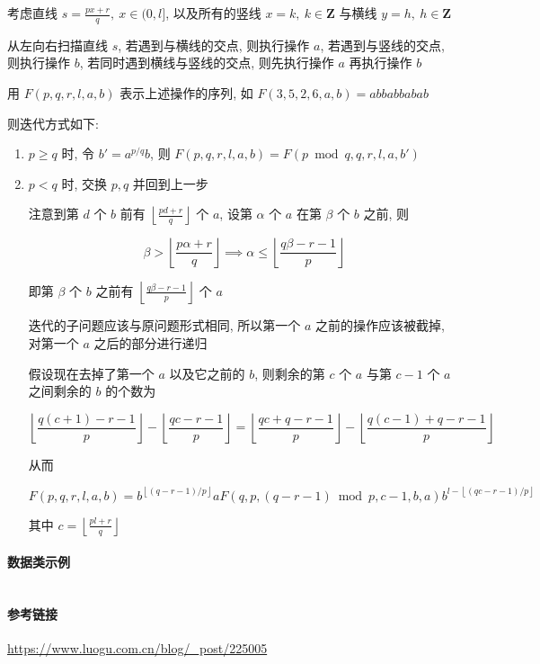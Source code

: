 考虑直线 \(s=\frac{px+r}{q},~x\in (0,l]\), 以及所有的竖线 \(x=k,~k\in\mathbf{Z}\) 与横线 \(y=h,~h\in\mathbf{Z}\)

从左向右扫描直线 \(s\), 若遇到与横线的交点, 则执行操作 \(a\), 若遇到与竖线的交点, 则执行操作 \(b\), 若同时遇到横线与竖线的交点, 则先执行操作 \(a\) 再执行操作 \(b\)

用 \(F(p,q,r,l,a,b)\) 表示上述操作的序列, 如 \(F(3,5,2,6,a,b)=abbabbabab\)

则迭代方式如下:

\begin{enumerate}
    \item \(p\geq q\) 时, 令 \(b'=a^{p/q}b\), 则 \(F(p,q,r,l,a,b)=F(p\bmod q,q,r,l,a,b')\)
    \item \(p<q\) 时, 交换 \(p,q\) 并回到上一步

          注意到第 \(d\) 个 \(b\) 前有 \(\left\lfloor\frac{pd+r}{q}\right\rfloor\) 个 \(a\), 设第 \(\alpha\) 个 \(a\) 在第 \(\beta\) 个 \(b\) 之前, 则

          \[
              \beta > \left\lfloor\frac{p\alpha+r}{q}\right\rfloor \implies \alpha \leq \left\lfloor\frac{q\beta-r-1}{p}\right\rfloor
          \]

          即第 \(\beta\) 个 \(b\) 之前有 \(\left\lfloor\frac{q\beta-r-1}{p}\right\rfloor\) 个 \(a\)

          迭代的子问题应该与原问题形式相同, 所以第一个 \(a\) 之前的操作应该被截掉, 对第一个 \(a\) 之后的部分进行递归

          假设现在去掉了第一个 \(a\) 以及它之前的 \(b\), 则剩余的第 \(c\) 个 \(a\) 与第 \(c-1\) 个 \(a\) 之间剩余的 \(b\) 的个数为

          \[
              \left\lfloor\frac{q(c+1)-r-1}{p}\right\rfloor-\left\lfloor\frac{qc-r-1}{p}\right\rfloor=\left\lfloor\frac{qc+q-r-1}{p}\right\rfloor-\left\lfloor\frac{q(c-1)+q-r-1}{p}\right\rfloor
          \]

          从而
          
          \[
              F(p,q,r,l,a,b)=b^{\left\lfloor (q-r-1)/p \right\rfloor}aF(q,p,(q-r-1)\bmod p,c-1,b,a)b^{l-\left\lfloor (qc-r-1)/p \right\rfloor}
          \]

          其中 \(c=\left\lfloor\frac{pl+r}{q}\right\rfloor\)
\end{enumerate}

\paragraph{数据类示例}

\inputminted{cpp}{src/src/exeuclid_node.cpp}

\paragraph{参考链接}

\url{https://www.luogu.com.cn/blog/_post/225005}
